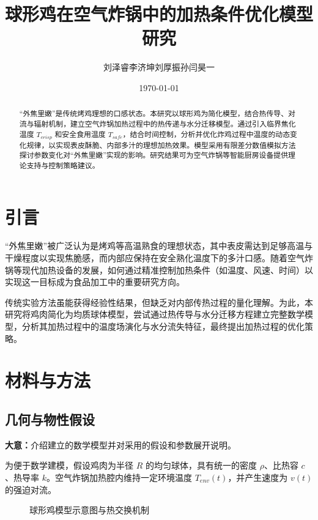 \documentclass[12pt]{article}
\title{球形鸡在空气炸锅中的加热条件优化模型研究}
\author{刘泽睿\quad 李济坤\quad 刘厚振\quad 孙闫昊一}
\date{\today}
\begin{document}
\maketitle

\begin{abstract}
“外焦里嫩”是传统烤鸡理想的口感状态。本研究以球形鸡为简化模型，结合热传导、对流与辐射机制，建立空气炸锅加热过程中的热传递与水分迁移模型。通过引入临界焦化温度 $T_{crisp}$ 和安全食用温度 $T_{safe}$，结合时间控制，分析并优化炸鸡过程中温度的动态变化规律，以实现表皮酥脆、内部多汁的理想加热效果。模型采用有限差分数值模拟方法探讨参数变化对“外焦里嫩”实现的影响。研究结果可为空气炸锅等智能厨房设备提供理论支持与控制策略建议。
\end{abstract}

\section{引言}
“外焦里嫩”被广泛认为是烤鸡等高温熟食的理想状态，其中表皮需达到足够高温与干燥程度以实现焦脆感，而内部应保持在安全熟化温度下的多汁口感。随着空气炸锅等现代加热设备的发展，如何通过精准控制加热条件（如温度、风速、时间）以实现这一目标成为食品加工中的重要研究方向。

传统实验方法虽能获得经验性结果，但缺乏对内部传热过程的量化理解。为此，本研究将鸡肉简化为均质球体模型，尝试通过热传导与水分迁移方程建立完整数学模型，分析其加热过程中的温度场演化与水分流失特征，最终提出加热过程的优化策略。\cite{example}

\section{材料与方法}

\subsection{几何与物性假设}
\begin{summarybox}
	\textbf{大意：}介绍建立的数学模型并对采用的假设和参数展开说明。
\end{summarybox}
\par 为便于数学建模，假设鸡肉为半径 $R$ 的均匀球体，具有统一的密度 $\rho$、比热容 $c$、热导率 $k$。空气炸锅加热腔内维持一定环境温度 $T_{env}(t)$，并产生速度为 $v(t)$ 的强迫对流。


\begin{figure}[htbp]
\centering
\caption{球形鸡模型示意图与热交换机制}
\label{fig:model}
\end{figure}
\end{document}
